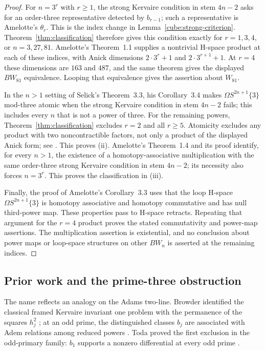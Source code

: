 \begin{proof}
For $n=3^r$ with $r\geq1$, the strong Kervaire condition in stem $4n-2$ asks for an order-three representative detected by $b_{r-1}$; such a representative is Amelotte's $\theta_r$. This is the index change in Lemma~\ref{cube:strong-criterion}. Theorem~\ref{thm:classification} therefore gives this condition exactly for $r=1,3,4$, or $n=3,27,81$. Amelotte's Theorem~1.1 \cite{Amelotte} supplies a nontrivial H-space product at each of these indices, with Anick dimensions $2\cdot3^r+1$ and $2\cdot3^{r+1}+1$. At $r=4$ these dimensions are $163$ and $487$, and the same theorem gives the displayed $BW_{81}$ equivalence. Looping that equivalence gives the assertion about $W_{81}$.

In the $n>1$ setting of Selick's Theorem~3.3, his Corollary~3.4 \cite{Selick} makes $\Omega S^{2n+1}\{3\}$ mod-three atomic when the strong Kervaire condition in stem $4n-2$ fails; this includes every $n$ that is not a power of three. For the remaining powers, Theorem~\ref{thm:classification} excludes $r=2$ and all $r\geq5$. Atomicity excludes any product with two noncontractible factors, not only a product of the displayed Anick form; see \cite[Definition~3.1 and its discussion]{Selick}. This proves \textup{(ii)}. Amelotte's Theorem~1.4 and its proof \cite{Amelotte} identify, for every $n>1$, the existence of a homotopy-associative multiplication with the same order-three strong Kervaire condition in stem $4n-2$; its necessity also forces $n=3^r$. This proves the classification in \textup{(iii)}.

Finally, the proof of Amelotte's Corollary~3.3 \cite{Amelotte} uses that the loop H-space $\Omega S^{2n+1}\{3\}$ is homotopy associative and homotopy commutative and has null third-power map. These properties pass to H-space retracts. Repeating that argument for the $r=4$ product proves the stated commutativity and power-map assertions. The multiplication assertion is existential, and no conclusion about power maps or loop-space structures on other $BW_n$ is asserted at the remaining indices.
\end{proof}

\subsection{Prior work and the prime-three obstruction}

The name reflects an analogy on the Adams two-line. Browder identified the classical framed Kervaire invariant one problem with the permanence of the squares $h_j^2$ \cite[Theorem~7.1]{Browder}; at an odd prime, the distinguished classes $b_j$ are associated with Adem relations among reduced powers \cite[Section~1]{Ravenel1978}. Toda proved the first exclusion in the odd-primary family: $b_1$ supports a nonzero differential at every odd prime \cite{TodaRelation}.

